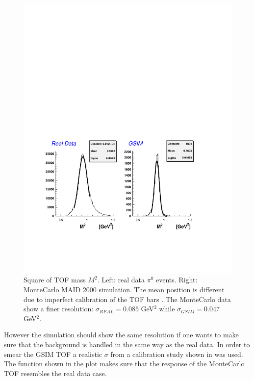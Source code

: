 \begin{figure}[h]
 \includegraphics[width = 15.4cm, bb=0 100 500 430]{acceptance/img/comp1_sc}
 \caption[Square of TOF mass $M^2$]
         { Square of TOF mass $M^2$. Left: real data 
		    $\pi^0$ events. Right: MonteCarlo MAID 2000 simulation. The mean position is different
		    due to imperfect calibration of the TOF bars
                    . The MonteCarlo data show a finer resolution:
		    $\sigma_{REAL} = 0.085$ GeV$^2$ while $\sigma_{GSIM} = 0.047$ GeV$^2$.}
 \label{fig:sc_comp1}
\end{figure}
However the simulation should show the same resolution if one wants to make sure that the background
is handled in the same way as the real data.
In order to smear the GSIM TOF a realistic $\sigma$ from a calibration study \cite{bib:tof} 
shown in  was used.
The function shown in the plot makes sure that the response of the MonteCarlo TOF resembles
the real data case.
